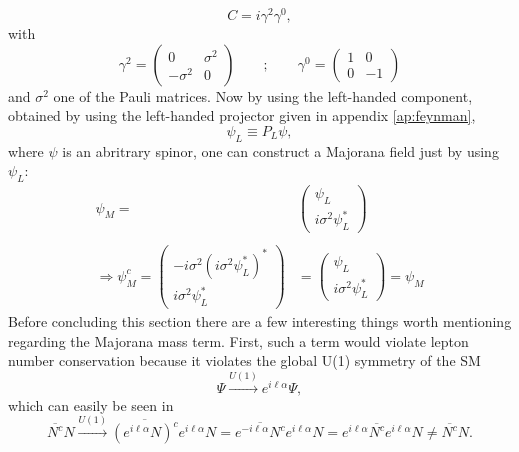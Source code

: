 \begin{equation}
	C=i\gamma^2\gamma^0,
\end{equation}
with
\begin{equation*}
\gamma^2=\left(\begin{array}{cc}0&\sigma^2\\-\sigma^2&0\end{array}\right)\qquad	;\qquad \gamma^0=\left(\begin{array}{cc}1&0\\0&-1\end{array}\right)
\end{equation*}
and $\sigma^2$ one of the Pauli matrices. Now by using the left-handed component, obtained by using the left-handed projector given in appendix \ref{ap:feynman}, 
\begin{equation}
	\psi_L\equiv P_L\psi,
\end{equation}
where $\psi$ is an abritrary spinor, one can construct a Majorana field just by using $\psi_L$:
\begin{align*}
	\psi_M=&\left(\begin{array}{c}\psi_L\\i\sigma^2\psi_L^*\end{array}\right)\\\\
	\Rightarrow \psi_M^c=\left(\begin{array}{c}-i\sigma^2(i\sigma^2\psi_L^*)^*\\i\sigma^2\psi_L^*\end{array}\right)&=\left(\begin{array}{c}\psi_L\\i\sigma^2\psi_L^*\end{array}\right)=\psi_M
\end{align*}
\newline \indent
Before concluding this section there are a few interesting things worth mentioning regarding the Majorana mass term. 
First, such a term would violate lepton number conservation because it violates the global U(1) symmetry of the SM
\begin{equation}
\Psi\overset{U(1)}{\longrightarrow}e^{i\ell\alpha}\Psi,
\end{equation}
which can easily be seen in
\begin{equation*}
\overline{N^c}N \overset{U(1)}{\longrightarrow}\overline{(e^{i \ell \alpha}N)^c}e^{i \ell\alpha}N=\overline{e^{-i \ell\alpha}N^c}e^{i \ell \alpha}N=e^{i \ell \alpha}\overline{N^c}e^{i \ell\alpha}N\neq	\overline{N^c}N.
\end{equation*}
